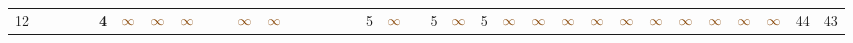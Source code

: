 \begin{landscape}
\begin{table}
\begin{adjustwidth}{-2.6cm}{}
{\begin{tabular}{l|lllllllllllllllllllllllllllllllll|ll}
		12   &            &                                                                 &                                                                 &                                                                 & \textbf{4}                                                      & $\textcolor[rgb]{0.541,0.29,0.043}{\infty}$ & $\textcolor[rgb]{0.541,0.29,0.043}{\infty}$ & $\textcolor[rgb]{0.541,0.29,0.043}{\infty}$ &                                                                 &                                                                 & $\textcolor[rgb]{0.541,0.29,0.043}{\infty}$ & $\textcolor[rgb]{0.541,0.29,0.043}{\infty}$ &                                                                 &                                                                 &                                                                 &                                                                 &                                                                 & 5                                                               & $\textcolor[rgb]{0.541,0.29,0.043}{\infty}$ &                                                                 & 5                                                               & $\textcolor[rgb]{0.541,0.29,0.043}{\infty}$ & 5                                                               & $\textcolor[rgb]{0.541,0.29,0.043}{\infty}$ & $\textcolor[rgb]{0.541,0.29,0.043}{\infty}$ & $\textcolor[rgb]{0.541,0.29,0.043}{\infty}$ & $\textcolor[rgb]{0.541,0.29,0.043}{\infty}$ & $\textcolor[rgb]{0.541,0.29,0.043}{\infty}$ & $\textcolor[rgb]{0.541,0.29,0.043}{\infty}$ & $\textcolor[rgb]{0.541,0.29,0.043}{\infty}$ & $\textcolor[rgb]{0.541,0.29,0.043}{\infty}$ & $\textcolor[rgb]{0.541,0.29,0.043}{\infty}$ & $\textcolor[rgb]{0.541,0.29,0.043}{\infty}$ & 44         & 43          \\

\end{tabular}}
\end{adjustwidth}
\end{table}
\end{landscape}
